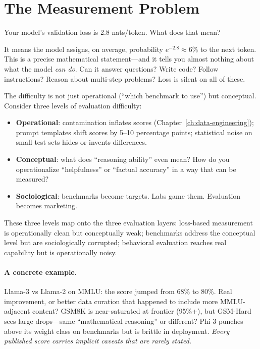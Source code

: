 \section{The Measurement Problem}
\label{sec:measurement-problem}

Your model's validation loss is 2.8 nats/token. What does that mean?

It means the model assigns, on average, probability $e^{-2.8} \approx 6\%$ to the next token. This is a precise mathematical statement---and it tells you almost nothing about what the model \emph{can do}. Can it answer questions? Write code? Follow instructions? Reason about multi-step problems? Loss is silent on all of these.

The difficulty is not just operational (``which benchmark to use'') but conceptual. Consider three levels of evaluation difficulty:

\begin{itemize}[nosep]
  \item \textbf{Operational}: contamination inflates scores (Chapter~\ref{ch:data-engineering}); prompt templates shift scores by 5--10 percentage points; statistical noise on small test sets hides or invents differences.
  \item \textbf{Conceptual}: what does ``reasoning ability'' even mean? How do you operationalize ``helpfulness'' or ``factual accuracy'' in a way that can be measured?
  \item \textbf{Sociological}: benchmarks become targets. Labs game them. Evaluation becomes marketing.
\end{itemize}

These three levels map onto the three evaluation layers: loss-based measurement is operationally clean but conceptually weak; benchmarks address the conceptual level but are sociologically corrupted; behavioral evaluation reaches real capability but is operationally noisy.

\paragraph{A concrete example.} Llama-3 vs Llama-2 on MMLU: the score jumped from 68\% to 80\%. Real improvement, or better data curation that happened to include more MMLU-adjacent content? GSM8K is near-saturated at frontier (95\%+), but GSM-Hard sees large drops---same ``mathematical reasoning'' or different? Phi-3 punches above its weight class on benchmarks but is brittle in deployment. \emph{Every published score carries implicit caveats that are rarely stated.}

